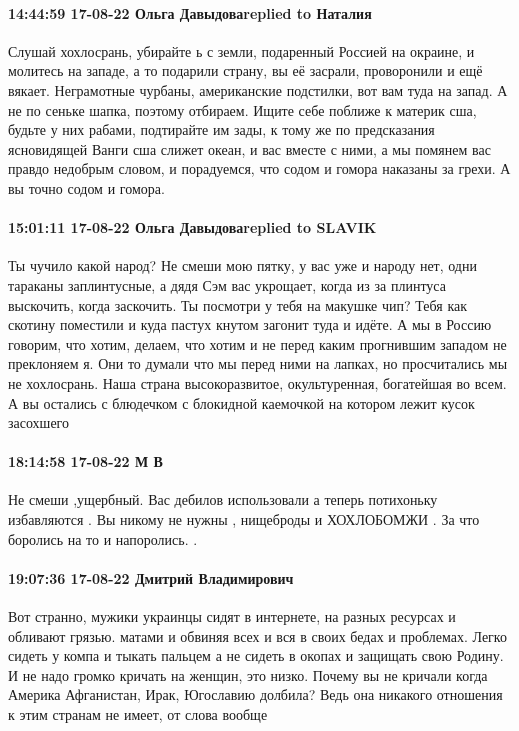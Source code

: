 \paragraph{14:44:59 17-08-22 Ольга Давыдоваreplied to Наталия}

Слушай хохлосрань, убирайте ь с земли, подаренный Россией на окраине, и
молитесь на западе, а то подарили страну, вы её засрали, проворонили и ещё
вякает. Неграмотные чурбаны, американские подстилки, вот вам туда на запад. А
не по сеньке шапка, поэтому отбираем. Ищите себе поближе к материк сша, будьте
у них рабами, подтирайте им зады, к тому же по предсказания ясновидящей Ванги
сша слижет океан, и вас вместе с ними, а мы помянем вас правдо недобрым словом,
и порадуемся, что содом и гомора наказаны за грехи. А вы точно содом и гомора.

\paragraph{15:01:11 17-08-22 Ольга Давыдоваreplied to SLAVIK}

Ты чучило какой народ? Не смеши мою пятку, у вас уже и народу нет, одни
тараканы заплинтусные, а дядя Сэм вас укрощает, когда из за плинтуса выскочить,
когда заскочить. Ты посмотри у тебя на макушке чип? Тебя как скотину поместили
и куда пастух кнутом загонит туда и идёте. А мы в Россию говорим, что хотим,
делаем, что хотим и не перед каким прогнившим западом не преклоняем я. Они то
думали что мы перед ними на лапках, но просчитались мы не хохлосрань. Наша
страна высокоразвитое, окультуренная, богатейшая во всем. А вы остались с
блюдечком с блокидной каемочкой на котором лежит кусок засохшего 💩💩💩💩

\paragraph{18:14:58 17-08-22 М В}

Не смеши ,ущербный. Вас дебилов использовали а теперь потихоньку избавляются .
Вы никому не нужны , нищеброды и ХОХЛОБОМЖИ . За что боролись на то и
напоролись. .

\paragraph{19:07:36 17-08-22 Дмитрий Владимирович}

Вот странно, мужики украинцы сидят в интернете, на разных ресурсах и обливают
грязью. матами и обвиняя всех и вся в своих бедах и проблемах. Легко сидеть у
компа и тыкать пальцем а не сидеть в окопах и защищать свою Родину. И не надо
громко кричать на женщин, это низко. Почему вы не кричали когда Америка
Афганистан, Ирак, Югославию долбила? Ведь она никакого отношения к этим странам
не имеет, от слова вообще
